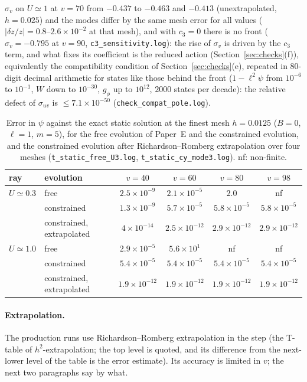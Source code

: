 \documentclass[11pt]{article}
\begin{document}
$\sigma_v$ on $U\simeq1$ at $v=70$ from $-0.437$ to $-0.463$ and $-0.413$ (unextrapolated, $h=0.025$) and the modes differ by the same mesh error for all values ($|\delta z/z|=0.8$--$2.6\times10^{-2}$ at that mesh), and with $c_3=0$ there is no front ($\sigma_v=-0.795$ at $v=90$, \texttt{c3\_sensitivity.log}): the rise of $\sigma_v$ is driven by the $c_3$ term, and what fixes its coefficient is the reduced action (Section~\ref{sec:checks}(f)), equivalently the compatibility condition of Section~\ref{sec:checks}(e), repeated in $80$-digit decimal arithmetic for states like those behind the front ($1-\ell^{2}\psi$ from $10^{-6}$ to $10^{-1}$, $W$ down to $10^{-30}$, $g_\phi$ up to $10^{12}$, $2000$ states per decade): the relative defect of $\sigma_{uv}$ is $\le7.1\times10^{-50}$ (\texttt{check\_compat\_pole.log}).

\begin{table}[ht]\centering\small
\caption{Error in $\psi$ against the exact static solution at the finest mesh $h=0.0125$ ($B=0$, $\ell=1$, $m=5$), for the free evolution of Paper~E and the constrained evolution, and the constrained evolution after Richardson--Romberg extrapolation over four meshes (\texttt{t\_static\_free\_U3.log}, \texttt{t\_static\_cy\_mode3.log}). nf: non-finite.}\label{tab:static}
\begin{tabular}{llcccc}
\toprule
ray & evolution & $v=40$ & $v=60$ & $v=80$ & $v=98$\\\midrule
$U\simeq0.3$ & free & $2.5\!\times\!10^{-9}$ & $2.1\!\times\!10^{-5}$ & $2.0$ & nf\\
 & constrained & $1.3\!\times\!10^{-9}$ & $5.7\!\times\!10^{-5}$ & $5.8\!\times\!10^{-5}$ & $5.8\!\times\!10^{-5}$\\
 & constrained, extrapolated & $4\!\times\!10^{-14}$ & $2.5\!\times\!10^{-12}$ & $2.9\!\times\!10^{-12}$ & $2.9\!\times\!10^{-12}$\\\midrule
$U\simeq1.0$ & free & $2.9\!\times\!10^{-5}$ & $5.6\!\times\!10^{1}$ & nf & nf\\
 & constrained & $5.4\!\times\!10^{-5}$ & $5.4\!\times\!10^{-5}$ & $5.4\!\times\!10^{-5}$ & $5.4\!\times\!10^{-5}$\\
 & constrained, extrapolated & $1.9\!\times\!10^{-12}$ & $1.9\!\times\!10^{-12}$ & $1.9\!\times\!10^{-12}$ & $1.9\!\times\!10^{-12}$\\\bottomrule
\end{tabular}
\end{table}

\paragraph{Extrapolation.} The production runs use Richardson--Romberg extrapolation in the step (the T-table of $h^{2}$-extrapolation; the top level is quoted, and its difference from the next-lower level of the table is the error estimate). Its accuracy is limited in $v$; the next two paragraphs say by what.
\end{document}
